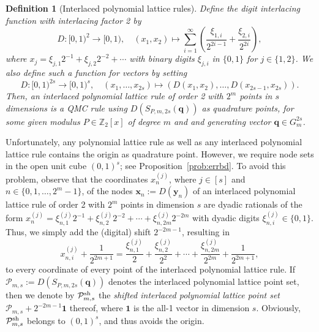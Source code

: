 \documentclass[namedate,webpdf,imanum]{ima-authoring-arxiv}%
\theoremstyle{thmstyletwo}%
\newtheorem{definition}{Definition}
\numberwithin{equation}{section}
\newcommand{\bsx}{\boldsymbol{x}}
\newcommand{\bsy}{\boldsymbol{y}}
\newcommand{\bsq}{\boldsymbol{q}}
\newcommand{\cP}{\mathcal{P}}
\begin{document}
\begin{definition}[Interlaced polynomial lattice rules] 
Define the digit interlacing function with interlacing factor 2 by
\begin{equation*}
D : [0,1)^2 \to [0,1), \quad (x_1,x_2) \mapsto \sum_{i=1}^{\infty} \left(\frac{\xi_{1,i}}{2^{2i-1}}+\frac{\xi_{2,i}}{2^{2i}}\right),
\end{equation*}
where $x_j = \xi_{j,1} 2^{-1} + \xi_{j,2} 2^{-2} + \cdots$ with binary digits $\xi_{j,i}$ in $\{0,1\}$ for $j \in \{1,2\}$. We also define such a function for vectors by setting
\begin{equation*}
D : [0,1)^{2 s} \to [0,1)^s, \quad (x_1, \dots, x_{2 s}) \mapsto \left( D(x_1,x_2), \dots, D(x_{2 s-1},x_{2 s}) \right).
\end{equation*}
Then, an {\it interlaced polynomial lattice rule of order 2} with $2^m$ points in $s$ dimensions is a QMC rule using $D(S_{P,m,2 s}(\bsq))$ as quadrature points, for some given modulus $P \in \mathbb{Z}_2[x]$ of degree $m$ and and generating vector $\bsq \in G^{2s}_{m}$.
\end{definition}

Unfortunately, any polynomial lattice rule as well as any interlaced polynomial lattice rule contains the origin as quadrature point. However, we require node sets in the open unit cube $(0,1)^s$; see Proposition~\ref{prob:errbd}. To avoid this problem, observe that the coordinates $x_{n}^{(j)}$, where $j \in [s]$ and $n \in \{0,1,\ldots,2^m-1\}$, of the nodes $\bsx_n:=D(\bsy_n)$ of an interlaced polynomial lattice rule of order 2 with $2^m$ points in dimension $s$ are dyadic rationals of the form $x_n^{(j)}=\xi_{n,1}^{(j)} 2^{-1}+\xi_{n,2}^{(j)} 2^{-2}+\cdots+\xi_{n,2 m}^{(j)} 2^{-2 m}$ with dyadic digits $\xi_{n,i}^{(j)} \in \{0,1\}$. Thus, we simply add the (digital) shift $2^{-2m-1}$, resulting in $$x_{n,i}^{(j)} + \frac{1}{2^{2m+1}}=\frac{\xi_{n,1}^{(j)}}{2}+\frac{\xi_{n,2}^{(j)}}{2^2}+\cdots+\frac{\xi_{n,2 m}^{(j)}}{2^{2 m}}+\frac{1}{2^{2m+1}},$$ to every coordinate of every point of the interlaced polynomial lattice rule. If $\cP_{m,s}:=D(S_{P,m,2 s}(\bsq))$ denotes the interlaced polynomial lattice point set, then we denote by $\cP_{m,s}^{{\rm sh}}$ the {\it shifted interlaced polynomial lattice point set} $\cP_{m,s} + 2^{-2m-1} \boldsymbol{1}$ thereof, where $\boldsymbol{1}$ is the all-1 vector in dimension $s$. Obviously, $\cP_{m,s}^{{\rm sh}}$ belongs to $(0,1)^s$, and thus avoids the origin.
\end{document}
